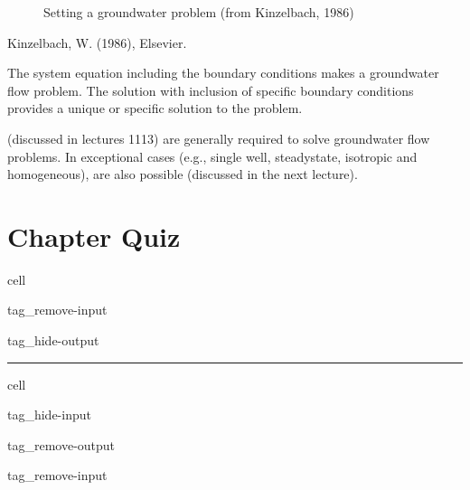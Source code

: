 \documentclass[letterpaper,10pt,english]{jupyterBook}
\begin{document}
\begin{figure}[htbp]
\centering
\capstart

\noindent{}
\caption{Setting a groundwater problem (from Kinzelbach, 1986\sphinxfootnotemark[2])}\label{\detokenize{content/flow/L7/17_quantify_flow:concept-gw-problem}}\end{figure}
%
\begin{footnotetext}[2]\label{\thesphinxscope.2}%
\sphinxAtStartFootnote
Kinzelbach, W. (1986),  Elsevier.
%
\end{footnotetext}\ignorespaces 
\sphinxAtStartPar
The system equation including the boundary conditions makes a  groundwater flow problem. The solution with inclusion of specific boundary conditions provides a unique or specific solution to the problem.

\sphinxAtStartPar
{} (discussed in lectures 11\sphinxhyphen{}13) are generally required to solve groundwater flow problems. In exceptional cases (e.g., single well, steady\sphinxhyphen{}state, isotropic and homogeneous),  are also possible (discussed in the next lecture).


\section{Chapter Quiz}
\label{\detokenize{content/flow/L7/17_quantify_flow:chapter-quiz}}
\begin{sphinxuseclass}{cell}
\begin{sphinxuseclass}{tag_remove-input}
\begin{sphinxuseclass}{tag_hide-output}
\end{sphinxuseclass}
\end{sphinxuseclass}
\end{sphinxuseclass}

\bigskip\hrule\bigskip


\sphinxstepscope

\begin{sphinxuseclass}{cell}
\begin{sphinxuseclass}{tag_hide-input}
\begin{sphinxuseclass}{tag_remove-output}
\begin{sphinxuseclass}{tag_remove-input}
\end{sphinxuseclass}
\end{sphinxuseclass}
\end{sphinxuseclass}
\end{sphinxuseclass}
\end{document}
